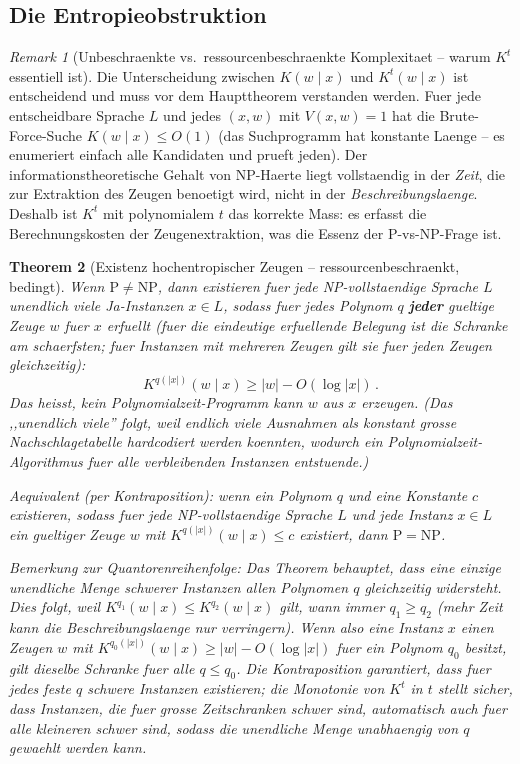\documentclass[aps,prd,twocolumn,superscriptaddress,nofootinbib]{revtex4-2}
\newtheorem{theorem}{Theorem}[section]
\theoremstyle{definition}
\theoremstyle{remark}
\newtheorem{remark}[theorem]{Remark}
\newcommand{\NP}{\mathrm{NP}}
\newcommand{\PP}{\mathrm{P}}
\begin{document}
\subsection{Die Entropieobstruktion}

\begin{remark}[Unbeschraenkte vs.\ ressourcenbeschraenkte Komplexitaet -- warum $K^t$ essentiell ist]
\label{rem:bounded-vs-unbounded}
Die Unterscheidung zwischen $K(w \mid x)$ und $K^t(w \mid x)$ ist entscheidend und muss vor dem Haupttheorem verstanden werden. Fuer jede entscheidbare Sprache $L$ und jedes $(x, w)$ mit $V(x,w) = 1$ hat die Brute-Force-Suche $K(w \mid x) \leq O(1)$ (das Suchprogramm hat konstante Laenge -- es enumeriert einfach alle Kandidaten und prueft jeden). Der informationstheoretische Gehalt von NP-Haerte liegt vollstaendig in der \textit{Zeit}, die zur Extraktion des Zeugen benoetigt wird, nicht in der \textit{Beschreibungslaenge}. Deshalb ist $K^t$ mit polynomialem $t$ das korrekte Mass: es erfasst die Berechnungskosten der Zeugenextraktion, was die Essenz der $\PP$-vs-$\NP$-Frage ist.
\end{remark}

\begin{theorem}[Existenz hochentropischer Zeugen -- ressourcenbeschraenkt, bedingt]
\label{thm:high_entropy}
Wenn $\PP \neq \NP$, dann existieren fuer jede NP-vollstaendige Sprache $L$ unendlich viele Ja-Instanzen $x \in L$, sodass fuer jedes Polynom $q$ \textbf{jeder} gueltige Zeuge $w$ fuer $x$ erfuellt (fuer die eindeutige erfuellende Belegung ist die Schranke am schaerfsten; fuer Instanzen mit mehreren Zeugen gilt sie fuer jeden Zeugen gleichzeitig):
\begin{equation}
K^{q(|x|)}(w \mid x) \geq |w| - O(\log |x|)\,.
\label{eq:high_entropy}
\end{equation}
Das heisst, kein Polynomialzeit-Programm kann $w$ aus $x$ erzeugen. (Das ,,unendlich viele'' folgt, weil endlich viele Ausnahmen als konstant grosse Nachschlagetabelle hardcodiert werden koennten, wodurch ein Polynomialzeit-Algorithmus fuer alle verbleibenden Instanzen entstuende.)

Aequivalent (per Kontraposition): wenn ein Polynom $q$ und eine Konstante $c$ existieren, sodass fuer jede NP-vollstaendige Sprache $L$ und jede Instanz $x \in L$ ein gueltiger Zeuge $w$ mit $K^{q(|x|)}(w \mid x) \leq c$ existiert, dann $\PP = \NP$.

Bemerkung zur Quantorenreihenfolge: Das Theorem behauptet, dass eine \emph{einzige} unendliche Menge schwerer Instanzen allen Polynomen $q$ gleichzeitig widersteht. Dies folgt, weil $K^{q_1}(w \mid x) \leq K^{q_2}(w \mid x)$ gilt, wann immer $q_1 \geq q_2$ (mehr Zeit kann die Beschreibungslaenge nur verringern). Wenn also eine Instanz $x$ einen Zeugen $w$ mit $K^{q_0(|x|)}(w \mid x) \geq |w| - O(\log |x|)$ fuer ein Polynom $q_0$ besitzt, gilt dieselbe Schranke fuer alle $q \leq q_0$. Die Kontraposition garantiert, dass fuer jedes feste $q$ schwere Instanzen existieren; die Monotonie von $K^t$ in $t$ stellt sicher, dass Instanzen, die fuer grosse Zeitschranken schwer sind, automatisch auch fuer alle kleineren schwer sind, sodass die unendliche Menge unabhaengig von $q$ gewaehlt werden kann.
\end{theorem}
\end{document}
